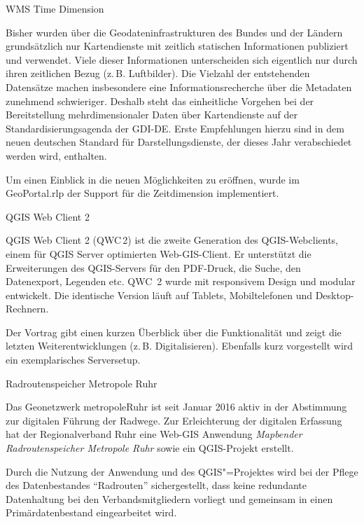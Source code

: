 %
{WMS Time Dimension}%
{}%
{
Bisher wurden über die Geodateninfrastrukturen des Bundes und der Ländern
grundsätzlich nur Kartendienste mit zeitlich statischen Informationen
publiziert und verwendet. Viele dieser Informationen
unterscheiden sich eigentlich nur durch ihren zeitlichen Bezug (z.\,B. Luftbilder). Die Vielzahl
der entstehenden Datensätze machen insbesondere eine Informationsrecherche über
die Metadaten zunehmend schwieriger. Deshalb steht das
einheitliche Vorgehen bei der Bereitstellung mehrdimensionaler Daten über
Kartendienste auf der Standardisierungsagenda der GDI-DE. Erste Empfehlungen
hierzu sind in dem neuen deutschen Standard für Darstellungsdienste, der dieses Jahr
verabschiedet werden wird, enthalten.

Um einen Einblick in die neuen Möglichkeiten zu eröffnen, wurde im
GeoPortal.rlp der Support für die Zeitdimension implementiert.%
}

%
{QGIS Web Client 2}%
{}%
{
QGIS Web Client 2 (QWC\,2) ist die zweite Generation des QGIS-Webclients, einem für QGIS Server
optimierten Web-GIS-Client. Er unterstützt die Erweiterungen des QGIS-Servers für den PDF-Druck, die Suche,
den Datenexport, Legenden etc. QWC~2 wurde mit responsivem Design und modular entwickelt. Die identische
Version läuft auf Tablets, Mobiltelefonen und Desktop-Rechnern.

Der Vortrag gibt einen kurzen Überblick über die Funktionalität und zeigt die letzten
Weiterentwicklungen (z.\,B. Digitalisieren). Ebenfalls kurz vorgestellt wird ein exemplarisches
Serversetup.%
}


%
{Radroutenspeicher Metropole Ruhr}%
{}%
{
Das Geonetzwerk metropoleRuhr ist seit Januar 2016 aktiv in der Abstimmung zur digitalen
Führung der Radwege. Zur Erleichterung der digitalen Erfassung hat der Regionalverband
Ruhr eine Web-GIS Anwendung \emph{Mapbender Radroutenspeicher Metropole Ruhr} sowie ein
QGIS-Projekt erstellt.

Durch die Nutzung der Anwendung und des QGIS"=Projektes wird bei der Pflege
des Datenbestandes "`Radrouten"' sichergestellt, dass keine redundante Datenhaltung bei den
Verbandsmitgliedern vorliegt und gemeinsam in einen Primärdatenbestand eingearbeitet wird.%
}

